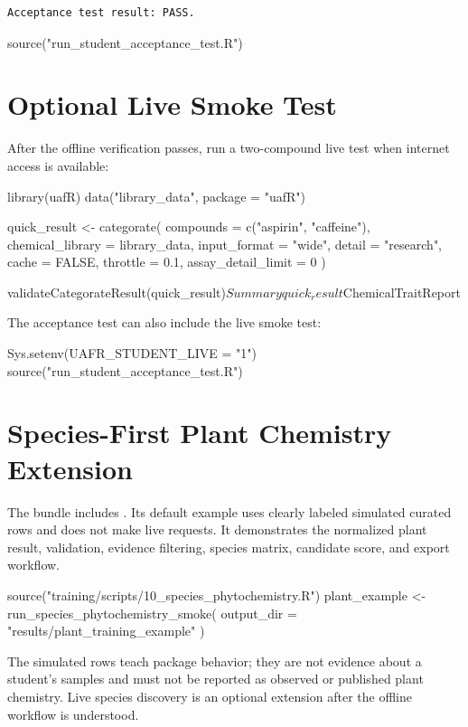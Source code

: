 \begin{verbatim}
Acceptance test result: PASS.
\end{verbatim}

\begin{rcode}
source("run_student_acceptance_test.R")
\end{rcode}

\section{Optional Live Smoke Test}
After the offline verification passes, run a two-compound live test when internet access is available:

\begin{rcode}
library(uafR)
data("library_data", package = "uafR")

quick_result <- categorate(
  compounds = c("aspirin", "caffeine"),
  chemical_library = library_data,
  input_format = "wide",
  detail = "research",
  cache = FALSE,
  throttle = 0.1,
  assay_detail_limit = 0
)

validateCategorateResult(quick_result)$Summary
quick_result$ChemicalTraitReport
\end{rcode}

The acceptance test can also include the live smoke test:

\begin{rcode}
Sys.setenv(UAFR_STUDENT_LIVE = "1")
source("run_student_acceptance_test.R")
\end{rcode}

\section{Species-First Plant Chemistry Extension}
The bundle includes . Its
default example uses clearly labeled simulated curated rows and does not make
live requests. It demonstrates the normalized plant result, validation,
evidence filtering, species matrix, candidate score, and export workflow.

\begin{rcode}
source("training/scripts/10_species_phytochemistry.R")
plant_example <- run_species_phytochemistry_smoke(
  output_dir = "results/plant_training_example"
)
\end{rcode}

The simulated rows teach package behavior; they are not evidence about a
student's samples and must not be reported as observed or published plant
chemistry. Live species discovery is an optional extension after the offline
workflow is understood.

